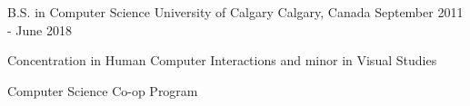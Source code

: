 \begin{cventries}
  \cventry
    {B.S. in Computer Science }
    {University of Calgary}
    {Calgary, Canada}
    {September 2011 - June 2018}
    {
      \begin{cvitems}
      \item {Concentration in Human Computer Interactions and minor in Visual Studies}
      \item {Computer Science Co-op Program}
      \end{cvitems}
    }
\end{cventries}
